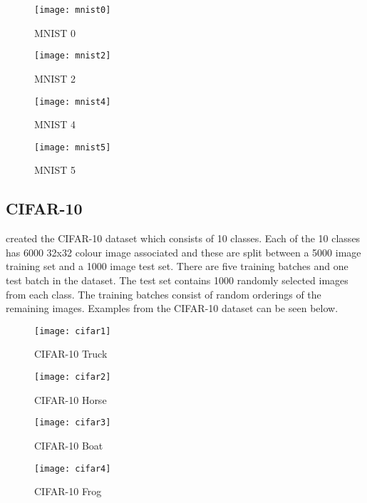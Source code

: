 \begin{figure}[h] 
  \label{mnistDataset} 
  \begin{minipage}[b]{0.25\linewidth}
    \centering
    \texttt{[image: mnist0]} 
    \caption{MNIST 0} 
    \vspace{4ex}
  \end{minipage}%
  \begin{minipage}[b]{0.25\linewidth}
    \centering
    \texttt{[image: mnist2]} 
    \caption{MNIST 2} 
  \label{fig:page2}
    \vspace{4ex}
  \end{minipage} 
  \begin{minipage}[b]{0.25\linewidth}
    \centering
    \texttt{[image: mnist4]} 
    \caption{MNIST 4} 
    \vspace{4ex}
  \end{minipage}%
  \begin{minipage}[b]{0.25\linewidth}
    \centering
    \texttt{[image: mnist5]} 
    \caption{MNIST 5} 
    \vspace{4ex}
  \end{minipage} 
\end{figure}

\subsection*{CIFAR-10}
\parencite{cifar} created the CIFAR-10 dataset which consists of 10 classes.
Each of the 10 classes has 6000 32x32 colour image associated and these are split between a 5000 image training set and a 1000 image test set.
There are five training batches and one test batch in the dataset.
The test set contains 1000 randomly selected images from each class.
The training batches consist of random orderings of the remaining images.
Examples from the CIFAR-10 dataset can be seen below.

\begin{figure}[h] 
  \label{cifar10} 
  \begin{minipage}[b]{0.25\linewidth}
    \centering
    \texttt{[image: cifar1]} 
    \caption{CIFAR-10 Truck} 
    \vspace{4ex}
  \end{minipage}%
  \begin{minipage}[b]{0.25\linewidth}
    \centering
    \texttt{[image: cifar2]} 
    \caption{CIFAR-10 Horse} 
  \label{fig:page2}
    \vspace{4ex}
  \end{minipage} 
  \begin{minipage}[b]{0.25\linewidth}
    \centering
    \texttt{[image: cifar3]} 
    \caption{CIFAR-10 Boat} 
    \vspace{4ex}
  \end{minipage}%
  \begin{minipage}[b]{0.25\linewidth}
    \centering
    \texttt{[image: cifar4]} 
    \caption{CIFAR-10 Frog} 
    \vspace{4ex}
  \end{minipage} 
\end{figure}